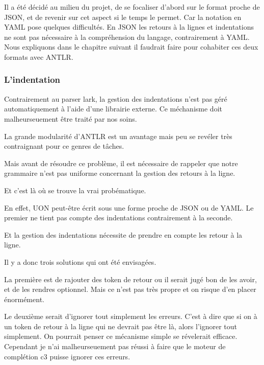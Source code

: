 \documentclass[
    iict, %
    il, %
]{heig-tb}
\begin{document}

Il a été décidé au milieu du projet, de se focaliser d'abord sur le format proche de JSON, et de revenir sur cet aspect si le temps le permet.
Car la notation en YAML pose quelques difficultés. %
En JSON les retours à la lignes et indentations ne sont pas nécessaire à la compréhension du langage, contrairement à YAML.
Nous expliquons dans le chapitre suivant il faudrait faire pour cohabiter ces deux formats avec ANTLR. %

\subsubsection{L'indentation}

Contrairement au parser lark, la gestion des indentations n'est pas géré automatiquement à l'aide d'une librairie externe.
Ce méchanisme doit malheurseuement être traité par nos soins.

La grande modularité d'ANTLR est un avantage mais peu se revéler très contraignant pour ce genres de tâches.

Mais avant de résoudre ce problème, il est nécessaire de rappeler que notre grammaire n'est pas uniforme concernant la gestion des retours à la ligne. 

Et c'est là où se trouve la vrai probématique.

En effet, UON peut-être écrit sous une forme proche de JSON ou de YAML. Le premier ne tient pas compte des indentations contrairement à la seconde.

Et la gestion des indentations nécessite de prendre en compte les retour à la ligne. %

Il y a donc trois solutions qui ont été envisagées.

La première est de rajouter des token de retour ou il serait jugé bon de les avoir, et de les rendres optionnel.
Mais ce n'est pas très propre et on risque d'en placer énormément.

Le deuxième serait d'ignorer tout simplement les erreurs. C'est à dire que si on à un token de retour à la ligne qui ne devrait pas être là, alors l'ignorer tout simplement.
On pourrait penser ce mécanisme simple se révelerait efficace. Cependant je n'ai malheurseuement pas réussi à faire que le moteur de complétion c3
puisse ignorer ces erreurs.
\end{document}
